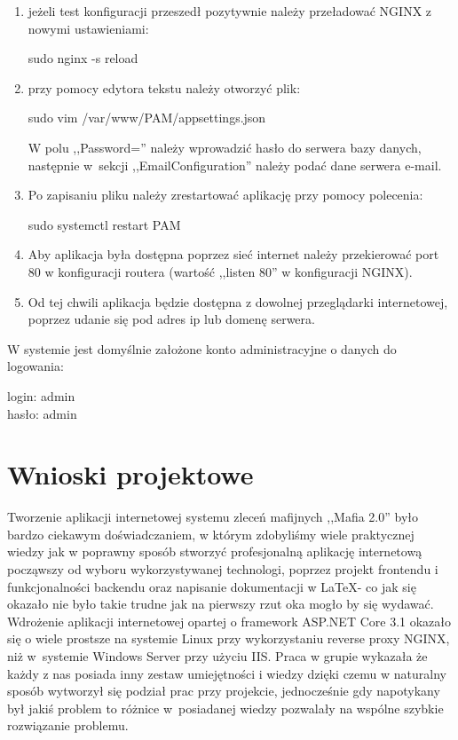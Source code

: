 \documentclass[12pt,a4paper]{article}
\begin{document}
\begin{enumerate}
				\item jeżeli test konfiguracji przeszedł pozytywnie należy przeładować NGINX z nowymi ustawieniami:	
					\begin{tcolorbox}[minipage,colback=white,arc=0pt,outer arc=0pt, fontupper=\footnotesize]
						sudo nginx -s reload
					\end{tcolorbox}			
			
				\item przy pomocy edytora tekstu należy otworzyć plik:
					\begin{tcolorbox}[minipage,colback=white,arc=0pt,outer arc=0pt, fontupper=\footnotesize]
						sudo vim /var/www/PAM/appsettings.json
					\end{tcolorbox}						
					W polu ,,Password='' należy wprowadzić hasło do serwera bazy danych, następnie w~sekcji ,,EmailConfiguration'' należy podać dane serwera e-mail.
				\item Po zapisaniu pliku należy zrestartować aplikację przy pomocy polecenia:
					\begin{tcolorbox}[minipage,colback=white,arc=0pt,outer arc=0pt, fontupper=\footnotesize]
						sudo systemctl restart PAM
					\end{tcolorbox}
				\item Aby aplikacja była dostępna poprzez sieć internet należy przekierować port 80 w konfiguracji routera (wartość ,,listen 80'' w konfiguracji NGINX).
				\item Od tej chwili aplikacja będzie dostępna z dowolnej przeglądarki internetowej, poprzez udanie się pod adres ip lub domenę serwera. 
			\end{enumerate}
			
			W systemie jest domyślnie założone konto administracyjne o danych do logowania:
			\begin{tcolorbox}[minipage,colback=white,arc=0pt,outer arc=0pt, fontupper=\footnotesize]
						login: admin\\
						hasło: admin
			\end{tcolorbox}
	\newpage
	
	\section{Wnioski projektowe}
		\indent Tworzenie aplikacji internetowej systemu zleceń mafijnych ,,Mafia 2.0'' było bardzo ciekawym doświadczaniem, w którym zdobyliśmy wiele praktycznej wiedzy jak w poprawny sposób
		stworzyć profesjonalną aplikację internetową począwszy od wyboru wykorzystywanej technologi, poprzez projekt frontendu i funkcjonalności backendu oraz napisanie dokumentacji
		w \LaTeX \space	- co jak się okazało nie było takie trudne jak na pierwszy rzut oka mogło by się wydawać. Wdrożenie aplikacji internetowej opartej o framework
		ASP.NET Core 3.1 okazało się o wiele prostsze na systemie Linux przy wykorzystaniu reverse proxy NGINX, niż w~systemie Windows Server przy użyciu IIS.
		Praca w grupie wykazała że każdy z nas posiada inny zestaw umiejętności i wiedzy dzięki czemu w naturalny sposób wytworzył się podział prac przy projekcie,
		jednocześnie gdy napotykany był jakiś problem to różnice w~posiadanej wiedzy pozwalały na wspólne szybkie rozwiązanie problemu. 		
\end{document}
